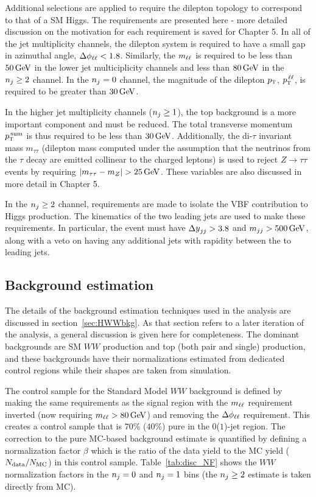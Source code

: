 Additional selections are applied to require the dilepton topology to correspond to that of a SM Higgs. The requirements are presented here - more detailed discussion on the motivation for each requirement is saved for Chapter 5. In all of the jet multiplicity channels, the dilepton system is required to have a small gap in azimuthal angle, $\Delta\phi_{\ell\ell} < 1.8$. Similarly, the $m_{\ell\ell}$ is required to be less than $50 \GeV$ in the lower jet multiciplicity channels and less than $80 \GeV$ in the $n_j \geq 2$ channel.  In the $n_j = 0$ channel, the magnitude of the dilepton $p_{\textrm{\footnotesize\sc t}}$, $p_{\textrm{\footnotesize\sc t}}^{\,\ell\ell}$, is required to be greater than $30 \GeV$. 

In the higher jet multiplicity channels ($n_j \geq 1$), the top background is a more important component and must be reduced. The total transverse momentum $p_{\textrm{\footnotesize\sc t}}^{\,\rm sum}$ is thus required to be less than $30 \GeV$. Additionally, the di-$\tau$ invariant mass $m_{\tau\tau}$ (dilepton mass computed under the assumption that the neutrinos from the $\tau$ decay are emitted collinear to the charged leptons) is used to reject $Z\to\tau\tau$ events by requiring $|m_{\tau\tau} - m_{Z}| > 25 \GeV$. These variables are also discussed in more detail in Chapter 5. 

In the $n_j \geq 2$ channel, requirements are made to isolate the VBF contribution to Higgs production. The kinematics of the two leading jets are used to make these requirements. In particular, the event must have $\dyjj > 3.8$ and $\mjj > 500 \GeV$, along with a veto on having any additional jets with rapidity between the to leading jets. 

\subsection{Background estimation}

The details of the background estimation techniques used in the \HWWfull analysis are discussed in section~\ref{sec:HWWbkg}. As that section refers to a later iteration of the analysis, a general discussion is given here for completeness. The dominant backgrounds are SM $WW$ production and top (both pair and single) production, and these backgrounds have their normalizations estimated from dedicated control regions while their shapes are taken from simulation. 

The control sample for the Standard Model $WW$ background is defined by making the same requirements as the signal region with the $m_{\ell\ell}$ requirement inverted (now requiring $\mll > 80 \GeV$) and removing the $\Delta\phi_{\ell\ell}$ requirement. This creates a control sample that is $70$\% ($40$\%) pure in the $0$($1$)-jet region. The correction to the pure MC-based background estimate is quantified by defining a normalization factor $\beta$ which is the ratio of the data yield to the MC yield ($N_{\rm data}/N_{\rm MC}$) in this control sample. Table~\ref{tab:disc_NF} shows the $WW$ normalization factors in the $n_j = 0$ and $n_j = 1$ bins (the $n_j \geq 2$ estimate is taken directly from MC). 

